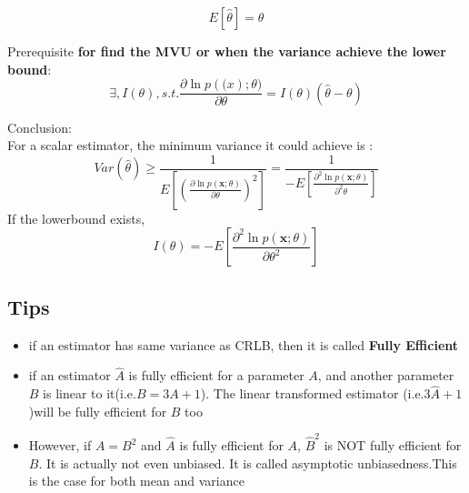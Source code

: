 \documentclass{article}
\begin{document}
$$E[\hat{\theta}]=\theta$$

Prerequisite \textbf{for find the MVU or when the variance achieve the lower bound}:
$$\exists, I(\theta),s.t. \frac{\partial \ln p(\bm(x);\theta)}{\partial \theta}=I(\theta)(\hat{\theta}-\theta)$$


Conclusion:\\
For a scalar estimator, the minimum variance it could achieve is :$$ Var(\hat{\theta})\geq \frac{1}{E[(\frac{\partial \ln{p(\bm{x};\theta)}}{\partial \theta})^2]}=\frac{1}{-E[\frac{\partial^2 \ln{p(\bm{x};\theta)}}{\partial^2 \theta}]}  $$
If the lowerbound exists, $$ I(\theta)=-E[\frac{\partial^2\ln p(\bm{x};\theta)}{\partial\theta^2}] $$
\subsection{Tips}
\begin{itemize}
    \item if an estimator has same variance as CRLB, then it is called \textbf{Fully Efficient}%
    \item if an estimator $\hat{A}$ is fully efficient for a parameter $A$, and another parameter $B$ is linear to it(i.e.$B=3A+1$). The linear transformed estimator (i.e.$3\hat{A}+1$)will be fully efficient for $B$ too
    \item However, if $A=B^2$ and $\hat{A}$ is fully efficient for $A$, $\hat{B}^2$ is NOT fully efficient for $B$. It is actually not even unbiased. It is called asymptotic unbiasedness.This is the case for both mean and variance
\end{itemize}
\end{document}
